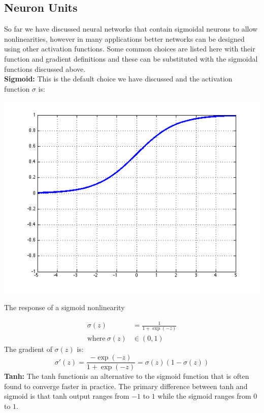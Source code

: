 \documentclass{tufte-handout}
\begin{document}
\subsection{Neuron Units}

So far we have discussed neural networks that contain sigmoidal neurons to allow nonlinearities, however in many applications better networks can be designed using other activation functions. Some common choices are listed here with their function and gradient definitions and these can be substituted with the sigmoidal functions discussed above.
$$ $$
\textbf{Sigmoid:} This is the default choice we have discussed and the activation function $\sigma$ is:
\begin{marginfigure}%
  \includegraphics[width=\linewidth]{graph_sigmoid}
  \caption{The response of a sigmoid nonlinearity}
  \label{fig:graph_sigmoid}
\end{marginfigure}
\begin{align*}
  \sigma(z) &= \frac{1}{1 + \operatorname{exp}(-z)}\\
  \text{where}~\sigma(z) &\in (0, 1)
\end{align*}
The gradient of $ \sigma(z) $ is:
$$ \sigma'(z) = \frac{- \operatorname{exp}(-z)}{1 +  \operatorname{exp}(-z)} = \sigma(z) (1 - \sigma(z))$$
\textbf{Tanh:} The tanh functionis an alternative to the sigmoid function that is often found to converge faster in practice. The primary difference between tanh and sigmoid is that tanh output ranges from $-1$ to $1$ while the sigmoid ranges from $0$ to $1$.
\end{document}
